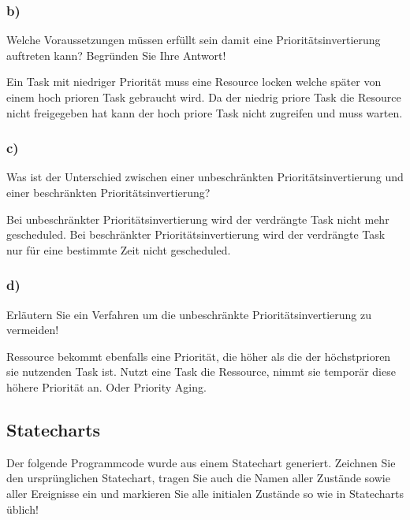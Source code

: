 \subsubsection{b)}
Welche Voraussetzungen müssen erfüllt sein damit eine Prioritätsinvertierung auftreten kann?
Begründen Sie Ihre Antwort!

Ein Task mit niedriger Priorität muss eine Resource locken welche später von einem hoch prioren Task gebraucht wird. 
Da der niedrig priore Task die Resource nicht freigegeben hat kann der hoch priore Task nicht zugreifen und muss warten.

\subsubsection{c)}
Was ist der Unterschied zwischen einer unbeschränkten Prioritätsinvertierung und einer beschränkten
Prioritätsinvertierung?

Bei unbeschränkter Prioritätsinvertierung wird der verdrängte Task nicht mehr gescheduled. Bei beschränkter Prioritätsinvertierung
wird der verdrängte Task nur für eine bestimmte Zeit nicht gescheduled.

\subsubsection{d)}
Erläutern Sie ein Verfahren um die unbeschränkte Prioritätsinvertierung zu vermeiden!

Ressource bekommt ebenfalls eine Priorität, die höher als die der höchstprioren sie nutzenden Task ist.
Nutzt eine Task die Ressource, nimmt sie temporär diese höhere Priorität an. Oder Priority Aging.

\subsection{Statecharts}
Der folgende Programmcode wurde aus einem Statechart generiert. Zeichnen Sie den ursprünglichen
Statechart, tragen Sie auch die Namen aller Zustände sowie aller Ereignisse ein und markieren Sie alle
initialen Zustände so wie in Statecharts üblich!

